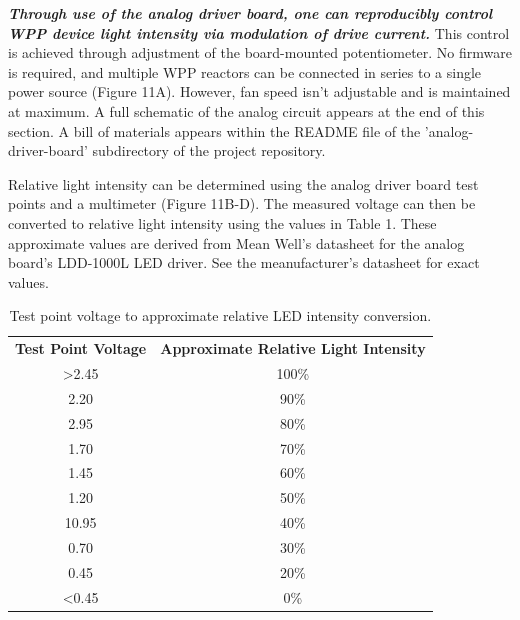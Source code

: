 \documentclass[11pt]{article}
\begin{document}
\textbf{\textit{Through use of the analog driver board, one can reproducibly control WPP device light intensity via modulation of drive current.}}
This control is achieved through adjustment of the board-mounted potentiometer.
No firmware is required, and multiple WPP reactors can be connected in series to a single power source (Figure 11A).
However, fan speed isn’t adjustable and is maintained at maximum.
A full schematic of the analog circuit appears at the end of this section.
A bill of materials appears within the README file of the 'analog-driver-board' subdirectory of the project repository.

Relative light intensity can be determined using the analog driver board test points and a multimeter (Figure 11B-D).
The measured voltage can then be converted to relative light intensity using the values in Table 1.
These approximate values are derived from Mean Well's datasheet for the analog board’s LDD-1000L LED driver.
See the meanufacturer's datasheet for exact values.

\begin{table}[H]
	\centering
	\begin{tabular}{cc}
		\centering
		\textbf{Test Point Voltage} & \textbf{Approximate Relative Light Intensity} \\
		>2.45                       & 100\%                                          \\
		2.20                        & 90\%                                             \\
		2.95                        & 80\%                                             \\
		1.70                         & 70\%                                             \\
		1.45                        & 60\%                                              \\
		1.20                        & 50\%                                              \\
		10.95                        & 40\%                                            \\
		0.70                        & 30\%                                              \\
		0.45                        & 20\%                                              \\
		<0.45                        & 0\%
	\end{tabular}
	\caption{Test point voltage to approximate relative LED intensity conversion.}
	\label{tab:analog-board-conversion}
\end{table}
\end{document}
